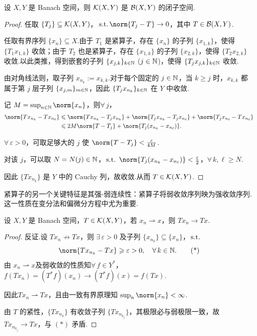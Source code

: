 \begin{theorem}[紧算子空间的闭性]
设 $X,Y$ 是 Banach 空间，则 $\mathcal{K}(X,Y)$ 是 $\mathcal{B}(X,Y)$ 的闭子空间.
\end{theorem}
\begin{proof}
任取 $\{T_j\}\subseteq\mathcal{K}(X,Y)$，$\st \norm{T_j - T}\to 0$，其中 $T\in\mathcal{B}(X,Y)$.\par
任取有界序列 $\{x_n\}\subseteq X$.由于 $T_1$ 是紧算子，存在 $\{x_n\}$ 的子列 $\{x_{1,k}\}$，使得 $\{T_1 x_{1,k}\}$ 收敛；由于 $T_2$ 也是紧算子，存在 $\{x_{1,k}\}$ 的子列 $\{x_{2,k}\}$，使得 $\{T_2 x_{2,k}\}$ 收敛.以此类推，得到嵌套的子列 $\{x_{j,k}\}_{k\in\mathbb{N}}$ ($j\in\mathbb{N}$)，使得 $\{T_j x_{j,k}\}_{k\in\mathbb{N}}$ 收敛.\par
由对角线法则，取子列 $x_{n_k} := x_{k,k}$.对于每个固定的 $j\in\mathbb{N}$，当 $k\geq j$ 时，$x_{k,k}$ 都属于第 $j$ 层子列 $\{x_{j,m}\}_{m\in\mathbb{N}}$，因此 $\{T_j x_{n_k}\}_{k\in\mathbb{N}}$ 在 $Y$ 中收敛.\par
记 $M = \sup_{n\in\mb{N}} \norm{x_n}$，则$\forall\, j$，
\begin{align*}
\norm{Tx_{n_k} - Tx_{n_\ell}}
&\leq \norm{Tx_{n_k} - T_j x_{n_k}} + \norm{T_j x_{n_k} - T_j x_{n_\ell}} + \norm{T_j x_{n_\ell} - Tx_{n_\ell}} \\
&\leq 2M\norm{T - T_j} + \norm{T_j(x_{n_k} - x_{n_\ell})}.
\end{align*}

$\forall\,\varepsilon>0$，可取足够大的 $j$ 使 $\norm{T - T_j}<\frac{\varepsilon}{4M}$.\par
对该 $j$，可以取 $N = N(j)\in\mathbb{N}$，$\operatorname{\,\text{s.t.}}$ $\norm{T_j(x_{n_k} - x_{n_\ell})}<\frac{\varepsilon}{2}$，$\forall\, k,\ell\geq N$.\par
因此 $\{Tx_{n_k}\}$ 是 $Y$ 中的 Cauchy 列，故收敛.从而 $T\in\mathcal{K}(X,Y)$.
\end{proof}

紧算子的另一个关键特征是其强-弱连续性：紧算子将弱收敛序列映为强收敛序列.这一性质在变分法和偏微分方程中尤为重要.

\begin{theorem}
设 $X,Y$ 是 Banach 空间，$T\in\mathcal{K}(X,Y)$，若 $x_n\rightharpoonup x$，则 $Tx_n\to Tx$.
\end{theorem}
\begin{proof}
反证.设 $Tx_n\not\to Tx$，则 $\exists\,\varepsilon>0$ 及子列 $\{x_{n_k}\}\subseteq\{x_n\}$，$\operatorname{\,\text{s.t.}}$
\begin{equation*}
\norm{Tx_{n_k} - Tx} \geq \varepsilon>0,\quad \forall\, k\in\mb{N}. \tag{*}
\end{equation*}
由 $x_n\rightharpoonup x$及弱收敛的性质知$\forall\, f\in Y^*$，$f(Tx_n) = (T^*f)(x_n)\to (T^*f)(x) = f(Tx)$.\par
因此$Tx_n\rightharpoonup Tx$，且由一致有界原理知 $\sup_n\norm{x_n}<\infty$.\par
由 $T$ 的紧性，$\{Tx_{n_k}\}$ 有收敛子列 $\{Tx_{n_{k_j}}\}$，其极限必与弱极限一致，故 $Tx_{n_{k_j}}\to Tx$，与 $(*)$ 矛盾.
\end{proof}

